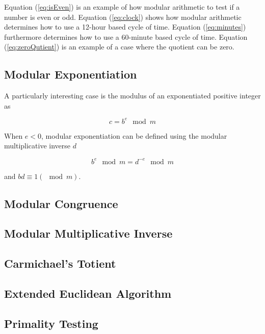 \documentclass{article}
\renewcommand{\_}{\ifincsname_\else\legacyunderscore\fi}
\begin{document}
        Equation (\ref{eq:isEven}) is an example of how modular arithmetic to test if a number is even or odd.  Equation (\ref{eq:clock}) shows how modular arithmetic determines how to use a 12-hour based cycle of time.  Equation (\ref{eq:minutes}) furthermore determines how to use a 60-minute based cycle of time.  Equation (\ref{eq:zeroQutient}) is an example of a case where the quotient can be zero.

    \subsection*{Modular Exponentiation}

        A particularly interesting case is the modulus of an exponentiated positive integer as

        \begin{equation}
            c = b^e \mod m
        \end{equation}

        When $e < 0$, modular exponentiation can be defined using the modular multiplicative inverse $d$

        \begin{equation}
            b^e \mod m = d^{-e} \mod m
        \end{equation}

        and $b d \equiv 1 (\mod m)$.

    \subsection*{Modular Congruence}

    \subsection*{Modular Multiplicative Inverse}

    \subsection*{Carmichael's Totient}

    \subsection*{Extended Euclidean Algorithm}

    \subsection*{Primality Testing}
\end{document}
